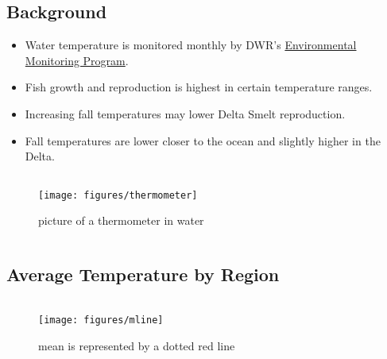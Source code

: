 \documentclass[
]{book}
\providecommand{\tightlist}{%
  \setlength{\itemsep}{0pt}\setlength{\parskip}{0pt}}
\begin{document}
\begin{columns-nocenter}

\begin{column}

\hypertarget{background-1}{%
\subsection{Background}\label{background-1}}

\begin{itemize}
\tightlist
\item
  Water temperature is monitored monthly by DWR's \href{https://emp.baydeltalive.com/wiki/12297}{Environmental Monitoring Program}.
\item
  Fish growth and reproduction is highest in certain temperature ranges.
\item
  Increasing fall temperatures may lower Delta Smelt reproduction.
\item
  Fall temperatures are lower closer to the ocean and slightly higher in the Delta.
\end{itemize}

\end{column}

\begin{column}

\begin{figure}

{\centering \texttt{[image: figures/thermometer]} 

}

\caption{picture of a thermometer in water}\label{fig:unnamed-chunk-100}
\end{figure}

\end{column}

\end{columns-nocenter}

\hypertarget{average-temperature-by-region}{%
\subsection{Average Temperature by Region}\label{average-temperature-by-region}}

\begin{columns-nocenter}

\begin{column}

\begin{figure}
\texttt{[image: figures/mline]} \caption{mean is represented by a dotted red line}\label{fig:unnamed-chunk-101}
\end{figure}

\end{column}

\begin{column}

\end{column}

\begin{column}

\end{column}

\end{columns-nocenter}
\end{document}
